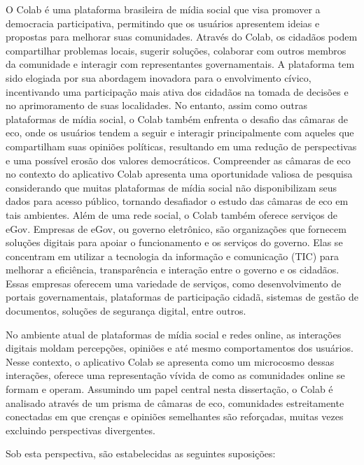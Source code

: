 O Colab é uma plataforma brasileira de mídia social que visa promover a democracia participativa, permitindo que os usuários apresentem ideias e propostas para melhorar suas comunidades. Através do Colab, os cidadãos podem compartilhar problemas locais, sugerir soluções, colaborar com outros membros da comunidade e interagir com representantes governamentais. A plataforma tem sido elogiada por sua abordagem inovadora para o envolvimento cívico, incentivando uma participação mais ativa dos cidadãos na tomada de decisões e no aprimoramento de suas localidades. No entanto, assim como outras plataformas de mídia social, o Colab também enfrenta o desafio das câmaras de eco, onde os usuários tendem a seguir e interagir principalmente com aqueles que compartilham suas opiniões políticas, resultando em uma redução de perspectivas e uma possível erosão dos valores democráticos. Compreender as câmaras de eco no contexto do aplicativo Colab apresenta uma oportunidade valiosa de pesquisa considerando que muitas plataformas de mídia social não disponibilizam seus dados para acesso público, tornando desafiador o estudo das câmaras de eco em tais ambientes. Além de uma rede social, o Colab também oferece serviços de eGov. Empresas de eGov, ou governo eletrônico, são organizações que fornecem soluções digitais para apoiar o funcionamento e os serviços do governo. Elas se concentram em utilizar a tecnologia da informação e comunicação (TIC) para melhorar a eficiência, transparência e interação entre o governo e os cidadãos. Essas empresas oferecem uma variedade de serviços, como desenvolvimento de portais governamentais, plataformas de participação cidadã, sistemas de gestão de documentos, soluções de segurança digital, entre outros.

No ambiente atual de plataformas de mídia social e redes online, as interações digitais moldam percepções, opiniões e até mesmo comportamentos dos usuários. Nesse contexto, o aplicativo Colab se apresenta como um microcosmo dessas interações, oferece uma representação vívida de como as comunidades online se formam e operam. Assumindo um papel central nesta dissertação, o Colab é analisado através de um prisma de câmaras de eco, comunidades estreitamente conectadas em que crenças e opiniões semelhantes são reforçadas, muitas vezes excluindo perspectivas divergentes.

Sob esta perspectiva, são estabelecidas as seguintes suposições:

